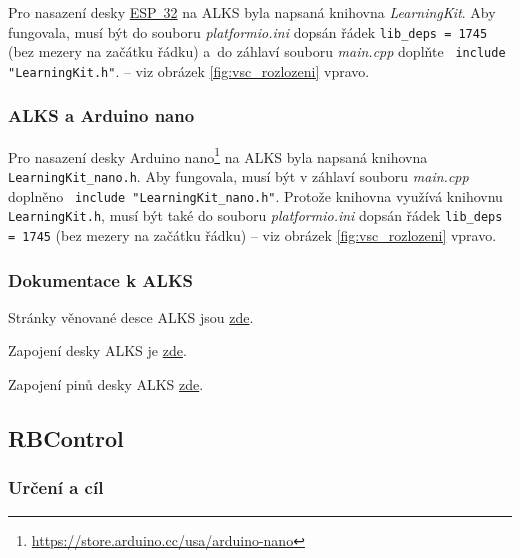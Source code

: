 Pro nasazení desky   \hyperref[esp32]{ESP~32}
 na ALKS byla  napsaná knihovna {\it LearningKit}. 
Aby fungovala, musí být do souboru {\it platformio.ini} dopsán řádek 
{\tt lib\_deps = 1745} (bez mezery na začátku řádku) a~do záhlaví souboru {\it main.cpp} doplňte 
\verb| include "LearningKit.h"|.
 -- viz obrázek \ref{fig:vsc_rozlozeni} vpravo.

\label{alks:nano} \subsubsection*{ALKS a Arduino nano}

Pro nasazení desky Arduino nano\footnote{\url{https://store.arduino.cc/usa/arduino-nano}} 
na ALKS byla  napsaná knihovna \newline
{\tt LearningKit\_nano.h}. 
Aby fungovala, musí být v záhlaví souboru {\it main.cpp} doplněno
\verb| include "LearningKit_nano.h"|. Protože knihovna  využívá 
knihovnu {\tt LearningKit.h}, musí být také do souboru {\it platformio.ini} dopsán řádek {\tt lib\_deps = 1745} (bez mezery na začátku řádku)  -- viz obrázek \ref{fig:vsc_rozlozeni} vpravo.



\subsubsection*{Dokumentace k ALKS}

Stránky  věnované desce ALKS jsou
 \href{https://github.com/RoboticsBrno/ArduinoLearningKitStarter}{zde}.

Zapojení desky ALKS je \href{https://github.com/RoboticsBrno/ArduinoLearningKitStarter/blob/master/docs/ArduinoLearningKitStarter.pdf}{zde}.

Zapojení pinů desky ALKS \href{https://github.com/RoboticsBrno/ArduinoLearningKitStarter/blob/master/docs/pinout.pdf}{zde}. 


\subsection{RBControl} 

\subsubsection*{Určení a cíl}

